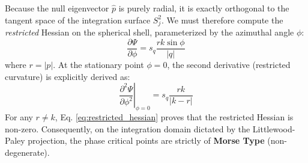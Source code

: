 \documentclass[12pt,a4paper]{article}
\theoremstyle{plain}
\theoremstyle{definition}
\theoremstyle{remark}
\begin{document}
Because the null eigenvector $\hat{p}$ is purely radial, it is exactly orthogonal to the tangent space of the integration surface $S^2_j$. We must therefore compute the \textit{restricted} Hessian on the spherical shell, parameterized by the azimuthal angle $\phi$:
\begin{equation}
    \frac{\partial \Psi}{\partial \phi} = s_q \frac{r k \sin\phi}{|q|}
\end{equation}
where $r = |p|$. At the stationary point $\phi = 0$, the second derivative (restricted curvature) is explicitly derived as:
\begin{equation}\label{eq:restricted_hessian}
    \left. \frac{\partial^2 \Psi}{\partial \phi^2} \right|_{\phi=0} = s_q \frac{r k}{|k-r|}
\end{equation}
For any $r \neq k$, Eq. \eqref{eq:restricted_hessian} proves that the restricted Hessian is non-zero. Consequently, on the integration domain dictated by the Littlewood-Paley projection, the phase critical points are strictly of \textbf{Morse Type} (non-degenerate). 
\end{document}
